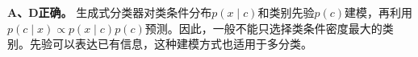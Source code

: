 \textbf{A、D正确。} 生成式分类器对类条件分布\(p(x\mid c)\)和类别先验\(p(c)\)建模，再利用\(p(c\mid x)\propto p(x\mid c)p(c)\)预测。因此，一般不能只选择类条件密度最大的类别。先验可以表达已有信息，这种建模方式也适用于多分类。
